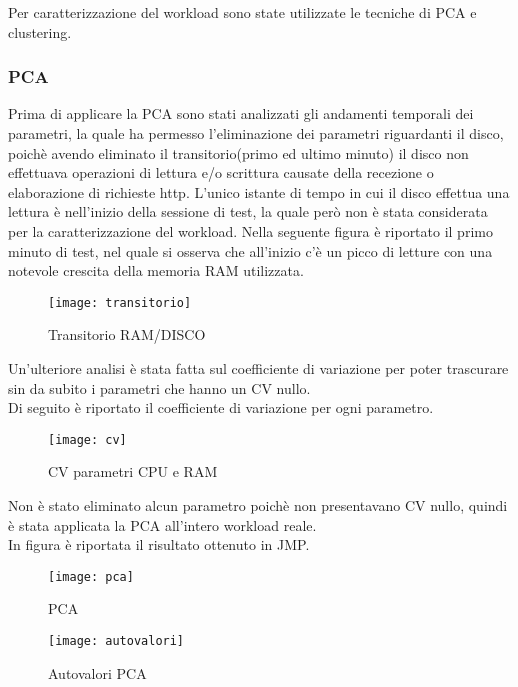 Per caratterizzazione del workload sono state utilizzate le tecniche di  PCA e
clustering.
\clearpage
\subsubsection{PCA}
Prima di applicare la PCA sono stati analizzati gli andamenti temporali dei parametri,
la quale ha permesso l'eliminazione dei parametri riguardanti il disco, poichè
avendo eliminato il transitorio(primo ed ultimo minuto) il disco non effettuava
operazioni di lettura e/o scrittura causate della recezione o elaborazione di richieste http.
L'unico istante di tempo in cui il disco effettua una lettura è nell'inizio della sessione
di test, la quale però non è stata considerata per la caratterizzazione del workload.
Nella seguente figura è riportato il primo minuto di test, nel quale si osserva che all'inizio
c'è un picco di letture con una notevole crescita della memoria RAM utilizzata.


\begin{figure}[!htbp]
  \centering
  \texttt{[image: transitorio]}
  \caption{Transitorio RAM/DISCO}
  \label{transitorio}
\end{figure}

\clearpage

Un'ulteriore analisi è stata fatta sul coefficiente
di variazione per poter trascurare sin da subito i parametri che hanno un CV nullo.\\
Di seguito è riportato il coefficiente di variazione per ogni parametro.\\

\begin{figure}[!htbp]
  \centering
  \texttt{[image: cv]}
  \caption{CV parametri CPU e RAM}
  \label{cv1}
\end{figure}
\clearpage
Non è stato eliminato alcun parametro poichè non presentavano CV nullo, quindi è
stata applicata la PCA all'intero workload reale.\\
In figura è riportata il risultato ottenuto in JMP.\\

\begin{figure}[!htbp]
  \centering
  \texttt{[image: pca]}
  \caption{PCA}
  \label{pca}
\end{figure}

\begin{figure}[!htbp]
  \centering
  \texttt{[image: autovalori]}
  \caption{Autovalori PCA}
  \label{autovalori}
\end{figure}
\clearpage

